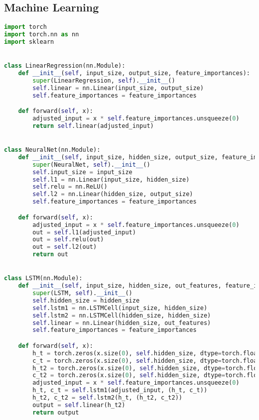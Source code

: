 \subsection{Machine Learning}
\label{subsec:code_ml}
\vspace{-0.3cm}

\begin{lstlisting}[language=Python,label={lst:ml.py}, basicstyle=\scriptsize]
import torch
import torch.nn as nn
import sklearn


class LinearRegression(nn.Module):
    def __init__(self, input_size, output_size, feature_importances):
        super(LinearRegression, self).__init__()
        self.linear = nn.Linear(input_size, output_size)
        self.feature_importances = feature_importances

    def forward(self, x):
        adjusted_input = x * self.feature_importances.unsqueeze(0)
        return self.linear(adjusted_input)


class NeuralNet(nn.Module):
    def __init__(self, input_size, hidden_size, output_size, feature_importances):
        super(NeuralNet, self).__init__()
        self.input_size = input_size
        self.l1 = nn.Linear(input_size, hidden_size)
        self.relu = nn.ReLU()
        self.l2 = nn.Linear(hidden_size, output_size)
        self.feature_importances = feature_importances

    def forward(self, x):
        adjusted_input = x * self.feature_importances.unsqueeze(0)
        out = self.l1(adjusted_input)
        out = self.relu(out)
        out = self.l2(out)
        return out


class LSTM(nn.Module):
    def __init__(self, input_size, hidden_size, out_features, feature_importances):
        super(LSTM, self).__init__()
        self.hidden_size = hidden_size
        self.lstm1 = nn.LSTMCell(input_size, hidden_size)
        self.lstm2 = nn.LSTMCell(hidden_size, hidden_size)
        self.linear = nn.Linear(hidden_size, out_features)
        self.feature_importances = feature_importances

    def forward(self, x):
        h_t = torch.zeros(x.size(0), self.hidden_size, dtype=torch.float32)
        c_t = torch.zeros(x.size(0), self.hidden_size, dtype=torch.float32)
        h_t2 = torch.zeros(x.size(0), self.hidden_size, dtype=torch.float32)
        c_t2 = torch.zeros(x.size(0), self.hidden_size, dtype=torch.float32)
        adjusted_input = x * self.feature_importances.unsqueeze(0)
        h_t, c_t = self.lstm1(adjusted_input, (h_t, c_t))
        h_t2, c_t2 = self.lstm2(h_t, (h_t2, c_t2))
        output = self.linear(h_t2)
        return output



\end{lstlisting}
